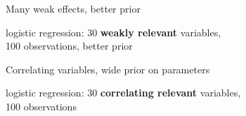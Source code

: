 \documentclass[english,t]{beamer}
\begin{document}
\begin{frame}{Many weak effects, better prior}

  logistic regression: 30 \textbf{weakly relevant} variables, \\100
  observations, better prior
  

\end{frame}

\begin{frame}{Correlating variables, wide prior on parameters}

  logistic regression: 30 \textbf{correlating relevant} variables, \\100
  observations
  

\end{frame}
\end{document}
